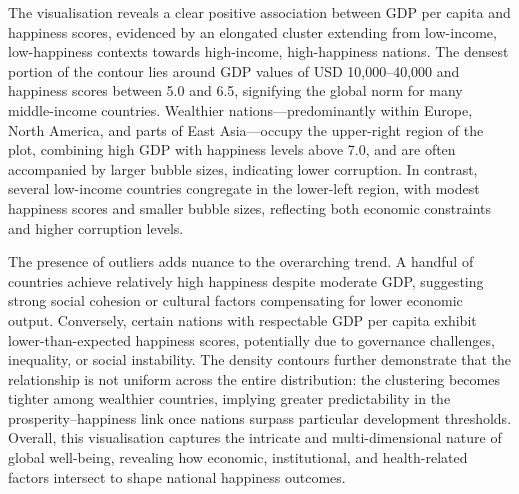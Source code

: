 \documentclass[conference]{IEEEtran}
\begin{document}
The visualisation reveals a clear positive association between GDP per capita and happiness scores, evidenced by an elongated cluster extending from low-income, low-happiness contexts towards high-income, high-happiness nations. The densest portion of the contour lies around GDP values of USD 10,000–40,000 and happiness scores between 5.0 and 6.5, signifying the global norm for many middle-income countries. Wealthier nations—predominantly within Europe, North America, and parts of East Asia—occupy the upper-right region of the plot, combining high GDP with happiness levels above 7.0, and are often accompanied by larger bubble sizes, indicating lower corruption. In contrast, several low-income countries congregate in the lower-left region, with modest happiness scores and smaller bubble sizes, reflecting both economic constraints and higher corruption levels.

The presence of outliers adds nuance to the overarching trend. A handful of countries achieve relatively high happiness despite moderate GDP, suggesting strong social cohesion or cultural factors compensating for lower economic output. Conversely, certain nations with respectable GDP per capita exhibit lower-than-expected happiness scores, potentially due to governance challenges, inequality, or social instability. The density contours further demonstrate that the relationship is not uniform across the entire distribution: the clustering becomes tighter among wealthier countries, implying greater predictability in the prosperity–happiness link once nations surpass particular development thresholds. Overall, this visualisation captures the intricate and multi-dimensional nature of global well-being, revealing how economic, institutional, and health-related factors intersect to shape national happiness outcomes.
\end{document}
